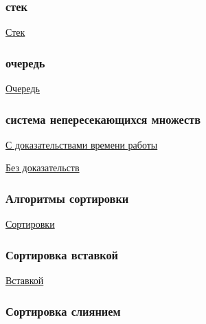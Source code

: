 \documentclass{article}
\begin{document}
\subsubsection{стек}

\href{https://neerc.ifmo.ru/wiki/index.php?title=%D0%A1%D1%82%D0%B5%D0%BA}{Стек}

\subsubsection{очередь}

\href{https://neerc.ifmo.ru/wiki/index.php?title=%D0%9E%D1%87%D0%B5%D1%80%D0%B5%D0%B4%D1%8C}{Очередь}

\subsubsection{система непересекающихся множеств}

\href{https://e-maxx.ru/algo/dsu}{С доказательствами времени работы}

\href{https://ru.algorithmica.org/cs/set-structures/dsu/#:~:text=%D0%A1%D0%B8%D1%81%D1%82%D0%B5%D0%BC%D0%B0%20%D0%BD%D0%B5%D0%BF%D0%B5%D1%80%D0%B5%D1%81%D0%B5%D0%BA%D0%B0%D1%8E%D1%89%D0%B8%D1%85%D1%81%D1%8F%20%D0%BC%D0%BD%D0%BE%D0%B6%D0%B5%D1%81%D1%82%D0%B2%20(%D0%B0%D0%BD%D0%B3%D0%BB.,%D1%87%D0%B5%D0%BC%D1%83%20%D1%80%D0%B0%D0%B2%D0%B5%D0%BD%20%D1%80%D0%B0%D0%B7%D0%BC%D0%B5%D1%80%20%D0%B4%D0%B0%D0%BD%D0%BD%D0%BE%D0%B3%D0%BE%20%D0%BC%D0%BD%D0%BE%D0%B6%D0%B5%D1%81%D1%82%D0%B2%D0%B0%C2%BB}{Без доказательств}

\subsubsection{Алгоритмы сортировки}

\href{https://neerc.ifmo.ru/wiki/index.php?title=%D0%A1%D0%BE%D1%80%D1%82%D0%B8%D1%80%D0%BE%D0%B2%D0%BA%D0%B8}{Сортировки}

\subsubsection{Сортировка вставкой}

\href{https://neerc.ifmo.ru/wiki/index.php?title=%D0%A1%D0%BE%D1%80%D1%82%D0%B8%D1%80%D0%BE%D0%B2%D0%BA%D0%B0_%D0%B2%D1%81%D1%82%D0%B0%D0%B2%D0%BA%D0%B0%D0%BC%D0%B8}{Вставкой}

\subsubsection{Сортировка слиянием}
\end{document}
